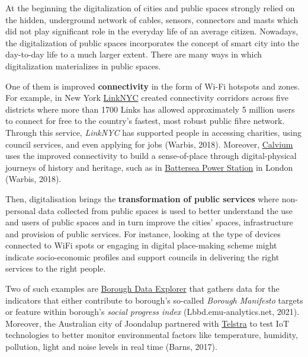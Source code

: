 \documentclass[
]{book}
\begin{document}
At the beginning the digitalization of cities and public spaces strongly relied on the hidden, underground network of cables, sensors, connectors and masts which did not play significant role in the everyday life of an average citizen. Nowadays, the digitalization of public spaces incorporates the concept of smart city into the day-to-day life to a much larger extent. There are many ways in which digitalization materializes in public spaces.

One of them is improved \textbf{connectivity} in the form of Wi-Fi hotspots and zones. For example, in New York \href{https://www.link.nyc/}{LinkNYC} created connectivity corridors across five districts where more than 1700 Links has allowed approximately 5 million users to connect for free to the country's fastest, most robust public fibre network. Through this service, \emph{LinkNYC} has supported people in accessing charities, using council services, and even applying for jobs (Warbis, 2018). Moreover, \href{https://calvium.com/}{Calvium} uses the improved connectivity to build a sense-of-place through digital-physical journeys of history and heritage, such as in \href{https://calvium.com/projects/battersea-power-station-redevelopment/}{Battersea Power Station} in London (Warbis, 2018).

Then, digitalisation brings the \textbf{transformation of public services} where non-personal data collected from public spaces is used to better understand the use and users of public spaces and in turn improve the cities' spaces, infrastructure and provision of public services. For instance, looking at the type of devices connected to WiFi spots or engaging in digital place-making scheme might indicate socio-economic profiles and support councils in delivering the right services to the right people.

Two of such examples are \href{https://lbbd.emu-analytics.net/main/(view/950db2c7-1a3b-448d-9b21-444a0ec7b5e0//rightBar:appinfo)?basemapDetail=1\&zoom=5.0\&lng=-0.36613\&lat=54.04187}{Borough Data Explorer} that gathers data for the indicators that either contribute to borough's so-called \emph{Borough Manifesto} targets or feature within borough's \emph{social progress index} (Lbbd.emu-analytics.net, 2021). Moreover, the Australian city of Joondalup partnered with \href{https://www.lakesidejoondalup.com.au/store-directory/telstra-shop/}{Telstra} to test IoT technologies to better monitor environmental factors like temperature, humidity, pollution, light and noise levels in real time (Barns, 2017).
\end{document}
